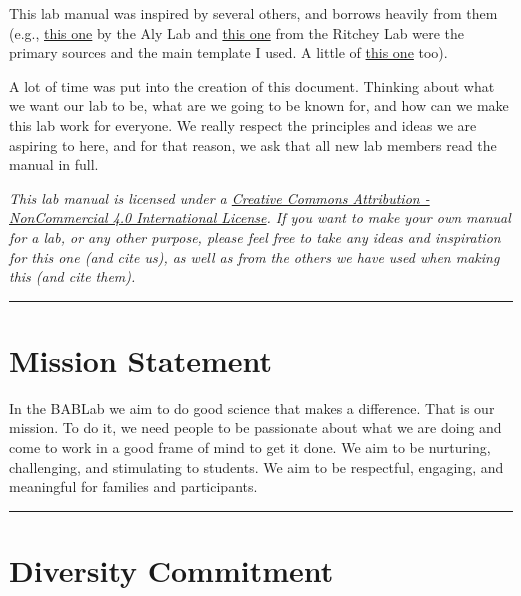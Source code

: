 \documentclass[
]{book}
\begin{document}
This lab manual was inspired by several others, and borrows heavily from them (e.g., \href{https://github.com/alylab/labmanual/blob/master/aly-lab-manual.pdf}{this one} by the Aly Lab and \href{https://github.com/memobc/memolab-manual}{this one} from the Ritchey Lab were the primary sources and the main template I used. A little of \href{https://github.com/jpeelle/peellelab_manual/blob/master/peellelab_manual.pdf}{this one} too).

A lot of time was put into the creation of this document. Thinking about what we want our lab to be, what are we going to be known for, and how can we make this lab work for everyone. We really respect the principles and ideas we are aspiring to here, and for that reason, we ask that all new lab members read the manual in full.

\emph{This lab manual is licensed under a \href{https://creativecommons.org/licenses/by-nc/4.0/}{Creative Commons Attribution - NonCommercial 4.0 International License}. If you want to make your own manual for a lab, or any other purpose, please feel free to take any ideas and inspiration for this one (and cite us), as well as from the others we have used when making this (and cite them).}

\begin{center}\rule{0.5\linewidth}{0.5pt}\end{center}

\hypertarget{mission-statement}{%
\section{Mission Statement}\label{mission-statement}}

In the BABLab we aim to do good science that makes a difference. That is our mission. To do it, we need people to be passionate about what we are doing and come to work in a good frame of mind to get it done. We aim to be nurturing, challenging, and stimulating to students. We aim to be respectful, engaging, and meaningful for families and participants.

\begin{center}\rule{0.5\linewidth}{0.5pt}\end{center}

\hypertarget{diversity-commitment}{%
\section{Diversity Commitment}\label{diversity-commitment}}
\end{document}
